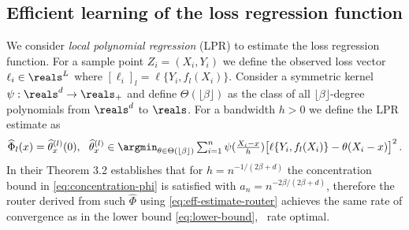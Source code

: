 

\subsection{Efficient learning of the loss regression function}
\label{sec:reg-fn-estimate}
We consider \emph{local polynomial regression} (LPR) to estimate the loss regression function. For a sample point $Z_i = (X_i, Y_i)$ we define the observed loss vector $\ell_i \in \reals^L$ where $[\ell_i]_l = \ell\{Y_i,f_l(X_i)\}$. Consider a symmetric kernel $\psi: \reals^d \to \reals_+$ and define $\Theta(\lfloor \beta \rfloor)$ as the class of all $\lfloor \beta \rfloor$-degree polynomials from $\reals^d$ to $\reals$. For a bandwidth $h > 0$ we define the LPR estimate as 
\begin{equation}
    \widehat \Phi_l(x) = \widehat\theta_x^{(l)}(0), ~~ \widehat \theta_x^{(l)} \in \argmin_{\theta \in \Theta(\lfloor \beta \rfloor)}  \textstyle \sum_{i = 1}^n \psi (\frac{X_i - x}{h}) \big [\ell \{Y_i, f_l(X_i)\} - \theta (X_i -x )\big]^2 \,. 
\end{equation}
In their Theorem 3.2 \citet{audibert2007Fast} establishes that for $h = n ^{-1/(2\beta + d)}$ the concentration bound in \eqref{eq:concentration-phi} is satisfied with $a_n = n^{-2\beta/(2\beta + d)}$, therefore the router derived from such $\widehat\Phi$ using \eqref{eq:eff-estimate-router} achieves the same rate of convergence as in the lower bound \eqref{eq:lower-bound}, \ie\ rate optimal. 